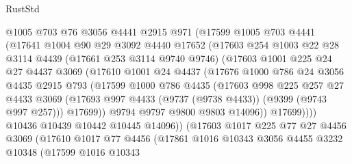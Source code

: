 \begin{lexlean}{RustStd}
\begin{coremodule}
                @1005
                @703
                @76
                @3056
                @4441
                @2915
                @971
                (@17599
                  @1005
                  @703
                  @4441
                  (@17641
                    @1004
                    @90
                    @29
                    @3092
                    @4440
                    @17652
                    (@17603
                      @254
                      @1003
                      @22
                      @28
                      @3114
                      @4439
                      (@17661 @253 @3114 @9740 @9746)
                      (@17603
                        @1001
                        @225
                        @24
                        @27
                        @4437
                        @3069
                        (@17610
                          @1001
                          @24
                          @4437
                          (@17676
                            @1000
                            @786
                            @24
                            @3056
                            @4435
                            @2915
                            @793
                            (@17599
                              @1000
                              @786
                              @4435
                              (@17603
                                @998
                                @225
                                @257
                                @27
                                @4433
                                @3069
                                (@17693 @997 @4433 (@9737 (@9738 @4433)) (@9399 (@9743 @997 @257)))
                                @17699))
                            @9794
                            @9797
                            @9800
                            @9803
                            @14096))
                        @17699))))
                @10436
                @10439
                @10442
                @10445
                @14096))
            (@17603
              @1017
              @225
              @77
              @27
              @4456
              @3069
              (@17610
                @1017
                @77
                @4456
                (@17861
                  @1016
                  @10343
                  @3056
                  @4455
                  @3232
                  @10348
                  (@17599
                    @1016
                    @10343

\end{coremodule}
\end{lexlean}
